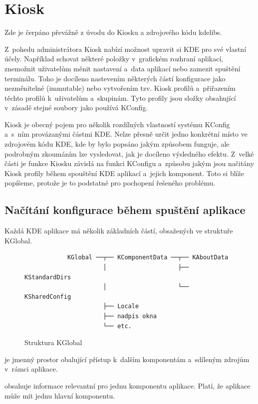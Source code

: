 \section{Kiosk}
Zde je čerpáno převážně z úvodu do Kiosku \cite{Kioskintro} a zdrojového kódu kdelibs.

Z~pohedu administrátora Kiosk nabízí možnost upravit si KDE pro své vlastní účely. Například schovat některé položky v~grafickém rozhraní aplikací, znemožnit uživatelům měnit nastavení a~data aplikací nebo zamezit spuštění terminálu. Toho je docíleno nastevením některých částí konfigurace jako nezměnitelné (immutable) nebo vytvořením tzv. Kiosk profilů a~přiřazením těchto profilů k~uživatelům a~skupinám. Tyto profily jsou složky obsahující v~zásadě stejné soubory jako používá KConfig.

Kiosk je obecný pojem pro několik rozdílných vlastností systému KConfig a~s~ním provázanými částmi KDE. Nelze přesně určit jedno konkrétní místo ve zdrojovém kódu KDE, kde by bylo popsáno jakým způsobem funguje, ale podrobným zkoumáním lze vysledovat, jak je docíleno výsledného efektu. Z~velké části je funkce Kiosku závislá na funkci KConfigu a~způsobu jakým jsou načitány Kiosk profily během spouštění KDE aplikací a~jejich komponent. Toto si blíže popíšeme, protože je to podstatné pro pochopení řešeného problému.

\subsection{Načítání konfigurace během spuštění aplikace}
Každá KDE aplikace má několik základních částí, obsažených ve struktuře KGlobal.

\begin{figure}[h]
    \centering
    \begin{verbatim}
            KGlobal ──┬── KComponentData ──┬── KAboutData
                      │                    ├── KStandardDirs
                      │                    └── KSharedConfig
                      ├── Locale
                      ├── nadpis okna
                      └── etc.\end{verbatim}
    \caption{Struktura KGlobal}
    \label{fig:kglobal}
\end{figure}

 je jmenný prostor obalující přístup k~dalším komponentám a~sdíleným zdrojům v~rámci aplikace.

 obsahuje informace relevantní pro jednu komponentu aplikace. Platí, že aplikace může mít jednu hlavní komponentu.

